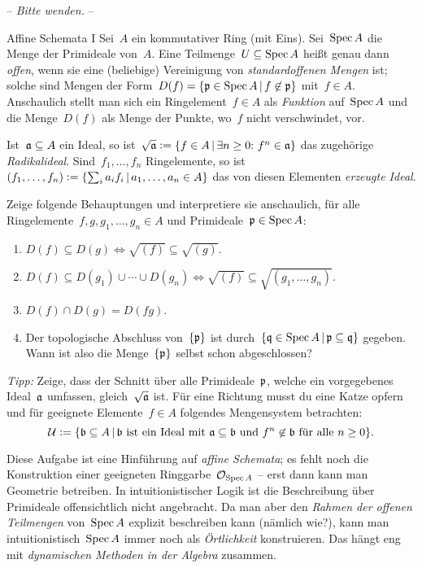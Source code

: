 \documentclass{uebblatt}
\begin{document}
\begin{center}-- \emph{Bitte wenden.} --\end{center}

\newpage

\begin{aufgabe}{Affine Schemata I}
Sei~$A$ ein kommutativer Ring (mit Eins). Sei~$\operatorname{Spec} A$ die Menge der Primideale
von~$A$. Eine Teilmenge~$U \subseteq \operatorname{Spec} A$ heißt genau dann \emph{offen},
wenn sie eine (beliebige) Vereinigung von \emph{standardoffenen Mengen}
ist; solche sind Mengen der Form~$D(f) = \{ \mathfrak{p} \in \operatorname{Spec} A \,|\, f \not\in
\mathfrak{p} \}$ mit~$f \in A$. Anschaulich stellt man sich ein Ringelement~$f \in A$
als \emph{Funktion} auf~$\operatorname{Spec} A$ und die Menge~$D(f)$ als Menge der Punkte,
wo~$f$ nicht verschwindet, vor.

Ist~$\mathfrak{a} \subseteq A$ ein Ideal, so ist~$\sqrt{\mathfrak{a}} \vcentcolon= \{ f \in A \,|\,
\exists n \geq 0{:}\ f^n \in \mathfrak{a} \}$ das zugehörige \emph{Radikalideal}.
Sind~$f_1,\ldots,f_n$ Ringelemente, so ist~$(f_1,\ldots,f_n) \vcentcolon= \{ \sum_i a_i
f_i \,|\, a_1,\ldots,a_n \in A \}$ das von diesen Elementen \emph{erzeugte
Ideal}.

Zeige folgende Behauptungen und interpretiere sie anschaulich, für alle
Ringelemente~$f,g,g_1,\ldots,g_n \in A$ und Primideale~$\mathfrak{p} \in \operatorname{Spec} A$:
\begin{enumerate}
\item $D(f) \subseteq D(g) \Longleftrightarrow \sqrt{(f)} \subseteq
\sqrt{(g)}$.
\item $D(f) \subseteq D(g_1) \cup \cdots \cup D(g_n) \Longleftrightarrow
\sqrt{(f)} \subseteq \sqrt{(g_1,\ldots,g_n)}$.
\item $D(f) \cap D(g) = D(fg)$.
\item Der topologische Abschluss von~$\{\mathfrak{p}\}$ ist
durch~$\{ \mathfrak{q} \in \operatorname{Spec} A \,|\, \mathfrak{p} \subseteq \mathfrak{q} \}$ gegeben.
Wann ist also die Menge~$\{\mathfrak{p}\}$ selbst schon abgeschlossen?
\end{enumerate}

\begin{tiny}
\emph{Tipp:} Zeige, dass der Schnitt über alle Primideale~$\mathfrak{p}$, welche ein
vorgegebenes Ideal~$\mathfrak{a}$ umfassen, gleich~$\sqrt{\mathfrak{a}}$ ist. Für eine Richtung
musst du eine Katze opfern und für geeignete Elemente~$f \in A$
folgendes Mengensystem betrachten:
\vspace{-0.3em}
\[ \mathcal{U} \vcentcolon= \{ \mathfrak{b} \subseteq A \,|\, \text{$\mathfrak{b}$ ist ein Ideal mit $\mathfrak{a}
\subseteq \mathfrak{b}$ und~$f^n \not\in \mathfrak{b}$ für alle~$n \geq 0$} \}. \]
\vspace{-2em}

Diese Aufgabe ist eine Hinführung auf \emph{affine Schemata}; es fehlt noch
die Konstruktion einer geeigneten Ringgarbe~$\mathcal{O}_{\operatorname{Spec} A}$ -- erst dann kann
man Geometrie betreiben.
In intuitionistischer Logik ist die Beschreibung über
Primideale offensichtlich nicht angebracht. Da man aber den \emph{Rahmen der
offenen Teilmengen} von~$\operatorname{Spec} A$ explizit beschreiben kann (nämlich wie?),
kann man intuitionistisch~$\operatorname{Spec} A$ immer noch als \emph{Örtlichkeit}
konstruieren. Das hängt eng mit \emph{dynamischen Methoden in der Algebra}
zusammen.\par
\end{tiny}
\end{aufgabe}
\end{document}
